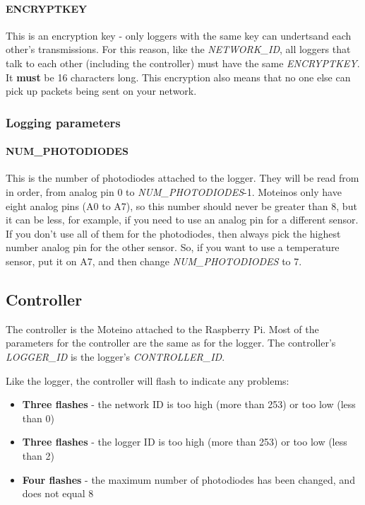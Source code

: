 \documentclass[10pt]{article}
\begin{document}
\paragraph{ENCRYPTKEY}
This is an encryption key - only loggers with the same key can undertsand each other's transmissions. For this reason, like the \textit{NETWORK\_ID}, all loggers that
talk to each other (including the controller) must have the same \textit{ENCRYPTKEY}. It \textbf{must} be 16 characters long. This encryption also means that no one
else can pick up packets being sent on your network.

\subsubsection{Logging parameters}

\paragraph{NUM\_PHOTODIODES}
This is the number of photodiodes attached to the logger. They will be read from in order, from analog pin 0 to \textit{NUM\_PHOTODIODES}-1. Moteinos only have eight analog pins (A0 to A7), so this number should never be greater than 8, but it can be less, for example, if you need to use an analog pin for a different sensor. If you don't use all of them for the photodiodes, then always pick the highest number analog pin for the other sensor. So, if you want to use a temperature sensor, put it on A7, and then change \textit{NUM\_PHOTODIODES} to 7.

\subsection{Controller}
The controller is the Moteino attached to the Raspberry Pi. Most of the parameters for the controller are the same as for the logger. The controller's \textit{LOGGER\_ID} is the logger's \textit{CONTROLLER\_ID}. 

Like the logger, the controller will flash to indicate any problems:

\begin{itemize}
 \item \textbf{Three flashes}	- the network ID is too high (more than 253) or too low (less than 0)
 \item \textbf{Three flashes}	- the logger ID is too high (more than 253) or too low (less than 2)
 \item \textbf{Four flashes}	- the maximum number of photodiodes has been changed, and does not equal 8
\end{itemize}
\end{document}
